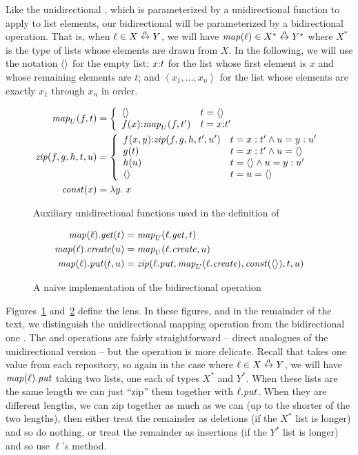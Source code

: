 Like the unidirectional \map, which is parameterized by a unidirectional
function to apply to list elements, our bidirectional \map will be
parameterized by a bidirectional operation. That is, when $\ell \in X \overset{a}{\leftrightarrow}
Y$, we will have $\mathit{map}(\ell) \in X^* \overset{a}{\leftrightarrow} Y^*$ where $X^*$ is the type of
lists whose elements are drawn from $X$. In the following, we will use the
notation $\left<\right>$ for the empty list; $x \mathord{:} t$ for the list whose first
element is $x$ and whose remaining elements are $t$; and
$\left<x_1,\ldots,x_n\right>$ for the list whose elements are exactly $x_1$
through $x_n$ in order.

\begin{figure}
    \begin{align*}
        \mathit{map}_U(f,t) &= \left\{\begin{array}{ll}
            \left<\right> & t = \left<\right> \\
            f(x) \mathord{:} \mathit{map}_U(f,t') & t = x \mathord{:} t'
        \end{array}\right. \\
        \mathit{zip}(f,g,h,t,u) &= \left\{\begin{array}{ll}
            f(x,y) \mathord{:} \mathit{zip}(f,g,h,t',u') & t = x:t' \land u = y:u' \\
            g(t) & t = x:t' \land u = \left<\right> \\
            h(u) & t = \left<\right> \land u = y:u' \\
            \left<\right> & t = u = \left<\right>
        \end{array}\right. \\
        \mathit{const}(x) &= \lambda y.\;x
    \end{align*}
    \caption{Auxiliary unidirectional functions used in the definition of \map}
    \label{fig:uni-map-zip-const}
\end{figure}
\begin{figure}
    \begin{align*}
        \mathit{map}(\ell).\mathit{get}(t) &= \mathit{map}_U(\ell.\mathit{get},t) \\
        \mathit{map}(\ell).\mathit{create}(u) &= \mathit{map}_U(\ell.\mathit{create},u) \\
        \mathit{map}(\ell).\mathit{put}(t,u) &=
            \mathit{zip}(\ell.\mathit{put},\mathit{map}_U(\ell.\mathit{create}),\mathit{const}(\left<\right>),t,u)
    \end{align*}
    \caption{A naive implementation of the bidirectional \map operation}
    \label{fig:naive-asymmetric-map}
\end{figure}
Figures~\ref{fig:uni-map-zip-const} and~\ref{fig:naive-asymmetric-map}
define the \map lens. In these figures, and in the remainder of the text, we
distinguish the unidirectional mapping operation \mapU from the
bidirectional one \map.  The \GET and \CREATE operations are fairly
straightforward -- direct analogues of the unidirectional version -- but the
\PUT operation is more delicate. Recall that \PUT takes one value from each
repository, so again in the case where $\ell \in X \overset{a}{\leftrightarrow} Y$, we will have
$\mathit{map}(\ell).\mathit{put}$ taking two lists, one each of types $X^*$ and $Y^*$.
When these lists are the same length we can just ``zip'' them together with
$\ell.\mathit{put}$. When they are different lengths, we can zip together as much
as we can (up to the shorter of the two lengths), then either treat the
remainder as deletions (if the $X^*$ list is longer) and so do nothing, or
treat the remainder as insertions (if the $Y^*$ list is longer) and so use
$\ell$'s \CREATE method.

